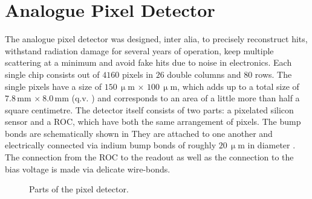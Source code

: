 \documentclass[british,11pt,a4paper]{memoir}
\begin{document}
\section{Analogue Pixel Detector}\label{s130}
The analogue pixel detector was designed, inter alia, to precisely reconstruct hits, withstand radiation damage for several years of operation, keep multiple scattering at a minimum and avoid fake hits due to noise in electronics. Each single chip consists out of $4160$ pixels in $26$ double columns and $80$ rows. The single pixels have a size of $150\,\upmu$m $\times$ $100\,\upmu$m, which adds up to a total size of $7.8\,$mm $\times\ 8.0\,$mm (q.v. ) and corresponds to an area of a little more than half a square centimetre. The detector itself consists of two parts: a pixelated silicon sensor and a \ac{ROC}, which have both the same arrangement of pixels. The bump bonds are schematically shown in  They are attached to one another and electrically connected via indium bump bonds of roughly $20\,\upmu$m in diameter \cite{kaestli}. The connection from the \ac{ROC} to the readout as well as the connection to the bias voltage is made via delicate wire-bonds.
\begin{figure}[ht]
	\centering
	\hfill
	\caption{Parts of the pixel detector.}
	\label{panaroc}
\end{figure}\no
\end{document}
